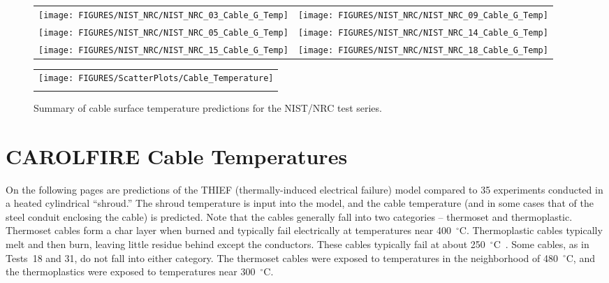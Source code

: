 \begin{figure}[p]
\begin{tabular*}{\textwidth}{l@{\extracolsep{\fill}}r}
\texttt{[image: FIGURES/NIST\_NRC/NIST\_NRC\_03\_Cable\_G\_Temp]} &
\texttt{[image: FIGURES/NIST\_NRC/NIST\_NRC\_09\_Cable\_G\_Temp]} \\
\texttt{[image: FIGURES/NIST\_NRC/NIST\_NRC\_05\_Cable\_G\_Temp]} &
\texttt{[image: FIGURES/NIST\_NRC/NIST\_NRC\_14\_Cable\_G\_Temp]} \\
\texttt{[image: FIGURES/NIST\_NRC/NIST\_NRC\_15\_Cable\_G\_Temp]} &
\texttt{[image: FIGURES/NIST\_NRC/NIST\_NRC\_18\_Cable\_G\_Temp]}
\end{tabular*}
\label{NIST_NRC_Cable_G_Open}
\end{figure}

\begin{figure}[p]
\begin{center}
\begin{tabular}{c}
\texttt{[image: FIGURES/ScatterPlots/Cable\_Temperature]} \\
\vspace{0.25in}
\end{tabular}
\end{center}
\caption[Summary of cable surface temperature predictions, NIST/NRC test series.]
{Summary of cable surface temperature predictions for the NIST/NRC test series.}
\end{figure}



\clearpage

\section{CAROLFIRE Cable Temperatures}

On the following pages are predictions of the THIEF (thermally-induced electrical failure) model compared to 35
experiments conducted in a heated cylindrical ``shroud.'' The shroud temperature is input into the model, and
the cable temperature (and in some cases that of the steel conduit enclosing the cable) is predicted. Note that the cables
generally fall into two categories -- thermoset and thermoplastic. Thermoset cables form a char layer when burned and typically
fail electrically at temperatures near 400~$^\circ$C. Thermoplastic cables typically melt and then burn, leaving little residue
behind except the conductors. These cables typically fail at about 250~$^\circ$C~\cite{CAROLFIRE}. Some cables, as in
Tests~18 and 31, do not fall into either category. The thermoset cables were exposed to temperatures in the neighborhood of
480~$^\circ$C, and the thermoplastics were exposed to temperatures near 300~$^\circ$C.

